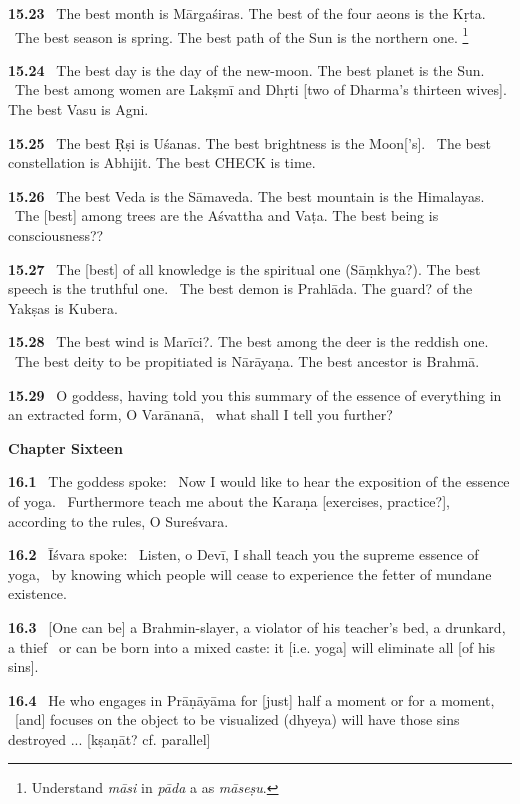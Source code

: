 \documentclass{article}
\newcommand{\skt}[1]{\textit{#1}}
\begin{document}
\textbf{15.23}%
\ The best month is Mārgaśiras. The best of the four aeons is the Kṛta.%
\                 The best season is spring. The best path of the Sun is the northern one.%
\footnote{Understand \skt{māsi} in \skt{pāda} a as \skt{māseṣu}. }%


\textbf{15.24}%
\ The best day is the day of the new-moon. The best planet is the Sun.%
\                   The best among women are Lakṣmī and Dhṛti [two of Dharma's thirteen wives]. The best Vasu is Agni.%


\textbf{15.25}%
\ The best Ṛṣi is Uśanas. The best brightness is the Moon['s].%
\                  The best constellation is Abhijit. The best CHECK is time.%


\textbf{15.26}%
\ The best Veda is the Sāmaveda. The best mountain is the Himalayas.%
\                  The [best] among trees are the Aśvattha and Vaṭa. The best being is consciousness??%


\textbf{15.27}%
\ The [best] of all knowledge is the spiritual one (Sāṃkhya?). The best speech is the truthful one.%
\                   The best demon is Prahlāda. The guard? of the Yakṣas is Kubera.%


\textbf{15.28}%
\ The best wind is Marīci?.  The best among the deer is the reddish one.%
\         The best deity to be propitiated is Nārāyaṇa. The best ancestor is Brahmā.%


\textbf{15.29}%
\ O goddess, having told you this summary of the essence of everything in an extracted form, O Varānanā,%
\                         what shall I tell you further?%
\vfill\pagebreak\begin{center}{\large\textbf{ Chapter Sixteen 
}}\end{center}


\textbf{16.1}%
\ The goddess spoke:%
\ Now I would like to hear the exposition of the essence of yoga.%
\ Furthermore teach me about the Karaṇa [exercises, practice?], according to the rules, O Sureśvara.%


\textbf{16.2}%
\ Īśvara spoke:%
\ Listen, o Devī, I shall teach you the supreme essence of yoga,%
\ by knowing which people will cease to experience the fetter of mundane existence.%


\textbf{16.3}%
\ [One can be] a Brahmin-slayer, a violator of his teacher's bed, a drunkard, a thief%
\ or can be born into a mixed caste: it [i.e. yoga] will eliminate all [of his sins].%


\textbf{16.4}%
\ He who engages in Prāṇāyāma for [just] half a moment or for a moment,%
\ [and] focuses on the object to be visualized (dhyeya) will have those sins destroyed ... [kṣaṇāt? cf. parallel]%
\end{document}
